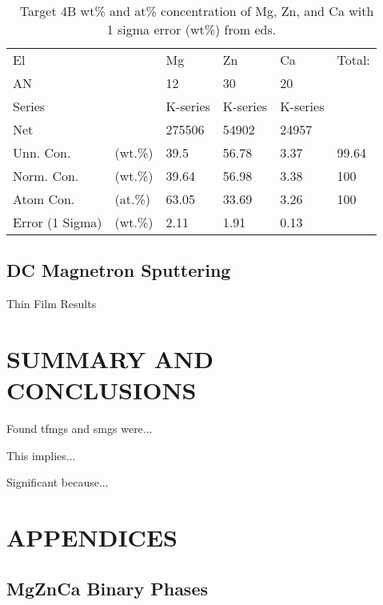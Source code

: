 \documentclass[a4paper,12pt,oneside]{report}%
\begin{document}
\begin{table}[H]
	\centering
	\begin{tabular}{ l l l l l l }
		\toprule
		El & & Mg & Zn & Ca & Total:  \\
		AN & & 12 & 30 & 20 &   \\
		\midrule
		Series & & K-series & K-series & K-series & \   \\
		Net & & 275506 & 54902 & 24957 & \   \\	
		Unn. Con. & (wt.\%) & 39.5 & 56.78 & 3.37 & 99.64 \\
		Norm. Con. & (wt.\%) & 39.64 & 56.98 & 3.38 & 100 \\
		Atom Con. & (at.\%) & 63.05 & 33.69 & 3.26 & 100 \\
		\midrule
		Error (1 Sigma) & (wt.\%) & 2.11 & 1.91 & 0.13 & \  \\
		\bottomrule
	\end{tabular}
	\caption{\MgZnCa~ Target 4B wt\% and at\% concentration of Mg, Zn, and Ca with 1 sigma error (wt\%) from \acrshort{eds}.}
	\label{tab:EDST4Tabel_V2}
\end{table}

\section{DC Magnetron Sputtering}
Thin Film Results


\chapter{SUMMARY AND CONCLUSIONS}
\glsresetall

Found \glspl{tfmg} and \glspl{smg} were...

This implies...

Significant because...







\chapter{APPENDICES}

\section{MgZnCa Binary Phases}
\end{document}
